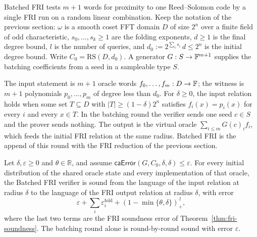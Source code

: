 Batched FRI tests $m+1$ words for proximity to one Reed--Solomon code by a single
FRI run on a random linear combination. Keep the notation of the previous section:
$\omega$ is a smooth coset FFT domain $D$ of size $2^n$ over a finite field of odd
characteristic, $s_0,\ldots,s_k\geq 1$ are the folding exponents, $d\geq 1$ is the
final degree bound, $l$ is the number of queries, and
$d_0:=2^{\sum_i s_i}\,d\leq 2^n$ is the initial degree bound. Write
$C_0=\mathrm{RS}(D,d_0)$. A generator $G:S\to\mathbb{F}^{m+1}$ supplies the batching
coefficients from a seed in a sampleable type $S$.

\begin{definition}\label{def:batched_fri}
\leanok
{}
The input statement is $m+1$ oracle words $f_0,\ldots,f_m:D\to\mathbb{F}$; the witness
is $m+1$ polynomials $p_0,\ldots,p_m$ of degree less than $d_0$. For
$\delta\geq 0$, the input relation holds when some set $T\subseteq D$ with
$|T|\geq(1-\delta)2^n$ satisfies $f_i(x)=p_i(x)$ for every $i$ and every
$x\in T$. In the batching round the verifier sends one seed $c\in S$ and the
prover sends nothing. The output is the virtual oracle
$\sum_{i\leq m}G(c)_i f_i$, which feeds the initial FRI relation at the same
radius. Batched FRI is the append of this round with the FRI reduction of the
previous section.
\end{definition}

\begin{theorem}\label{thm:batched_fri_soundness}
\leanok
{}
Let $\delta,\varepsilon\geq 0$ and $\theta\in\mathbb{R}$, and assume
$\mathsf{caError}(G,C_0,\delta,\delta)\leq\varepsilon$. For every initial
distribution of the shared oracle state and every implementation of that oracle,
the Batched FRI verifier is sound from the language of the input relation at
radius $\delta$ to the language of the FRI output relation at radius $\delta$,
with error
\[
  \varepsilon+\sum_i\varepsilon^{\mathrm{fold}}_i+(1-\min\{\theta,\delta\})_+^{\,l},
\]
where the last two terms are the FRI soundness error of
Theorem~\ref{thm:fri-soundness}. The batching round alone is round-by-round sound
with error $\varepsilon$.
\end{theorem}

